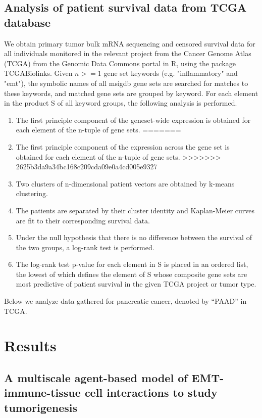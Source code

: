 \documentclass[11pt]{article}
\begin{document}
\subsection{Analysis of patient survival data from TCGA database}
We obtain primary tumor bulk mRNA sequencing and censored survival data for all individuals monitored in the relevant project from the Cancer Genome Atlas (TCGA) from the Genomic Data Commons portal in R, using the package TCGABiolinks.  Given $n >= 1$ gene set keywords (e.g. "inflammatory" and "emt"), the symbolic names of all msigdb gene sets are searched for matches to these keywords, and matched gene sets are grouped by keyword. For each element in the product S of all keyword groups, the following analysis is performed.
\begin{enumerate}
<<<<<<< HEAD
     \item The first principle component of the geneset-wide expression is obtained for each element of the n-tuple of gene sets.
=======
     \item The first principle component of the expression across the gene set is obtained for each element of the n-tuple of gene sets.
>>>>>>> 2625b3da9a34bc168c209cda09e0a4cd005e9327
     \item Two clusters of n-dimensional patient vectors are obtained by k-means clustering.
     \item The patients are separated by their cluster identity and Kaplan-Meier curves are fit to their corresponding survival data.
     \item Under the null hypothesis that there is no difference between the survival of the two groups, a log-rank test is performed.
     \item The log-rank test p-value for each element in S is placed in an ordered list, the lowest of which defines the element of S whose composite gene sets are most predictive of patient survival in the given TCGA project or tumor type.
\end{enumerate}
Below we analyze data gathered for pancreatic cancer, denoted by ``PAAD'' in TCGA.     




\section{Results}

\subsection{A multiscale agent-based model of EMT-immune-tissue cell interactions to study tumorigenesis}\label{ExplModel}
\end{document}
